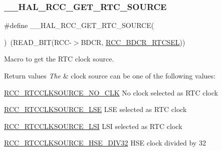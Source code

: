 \subsubsection{\texorpdfstring{\+\_\+\+\_\+\+H\+A\+L\+\_\+\+R\+C\+C\+\_\+\+G\+E\+T\+\_\+\+R\+T\+C\+\_\+\+S\+O\+U\+R\+CE}{\_\_HAL\_RCC\_GET\_RTC\_SOURCE}}
{\footnotesize\ttfamily \#define \+\_\+\+\_\+\+H\+A\+L\+\_\+\+R\+C\+C\+\_\+\+G\+E\+T\+\_\+\+R\+T\+C\+\_\+\+S\+O\+U\+R\+CE(\begin{DoxyParamCaption}{ }\end{DoxyParamCaption})~(R\+E\+A\+D\+\_\+\+B\+IT(R\+CC-\/$>$B\+D\+CR, \hyperlink{group___peripheral___registers___bits___definition_gabe30dbd38f6456990ee641648bc05d40}{R\+C\+C\+\_\+\+B\+D\+C\+R\+\_\+\+R\+T\+C\+S\+EL}))}



Macro to get the R\+TC clock source. 


\begin{DoxyRetVals}{Return values}
{\em The} & clock source can be one of the following values\+: \begin{DoxyItemize}
\item \hyperlink{group___r_c_c___r_t_c___clock___source_gacce0b2f54d103340d8c3a218e86e295d}{R\+C\+C\+\_\+\+R\+T\+C\+C\+L\+K\+S\+O\+U\+R\+C\+E\+\_\+\+N\+O\+\_\+\+C\+LK} No clock selected as R\+TC clock \item \hyperlink{group___r_c_c___r_t_c___clock___source_ga5dca8d63f250a20bd6bc005670d0c150}{R\+C\+C\+\_\+\+R\+T\+C\+C\+L\+K\+S\+O\+U\+R\+C\+E\+\_\+\+L\+SE} L\+SE selected as R\+TC clock \item \hyperlink{group___r_c_c___r_t_c___clock___source_gab47a1afb8b5eef9f20f4772961d0a5f4}{R\+C\+C\+\_\+\+R\+T\+C\+C\+L\+K\+S\+O\+U\+R\+C\+E\+\_\+\+L\+SI} L\+SI selected as R\+TC clock \item \hyperlink{group___r_c_c___r_t_c___clock___source_ga070b819c6eca00d4b89cbf35216c3a92}{R\+C\+C\+\_\+\+R\+T\+C\+C\+L\+K\+S\+O\+U\+R\+C\+E\+\_\+\+H\+S\+E\+\_\+\+D\+I\+V32} H\+SE clock divided by 32 \end{DoxyItemize}
\\
\hline
\end{DoxyRetVals}
\mbox{\label{group___r_c_c___r_t_c___clock___configuration_ga2d6c4c7e951bfd007d26988fbfe6eaa4}} 
